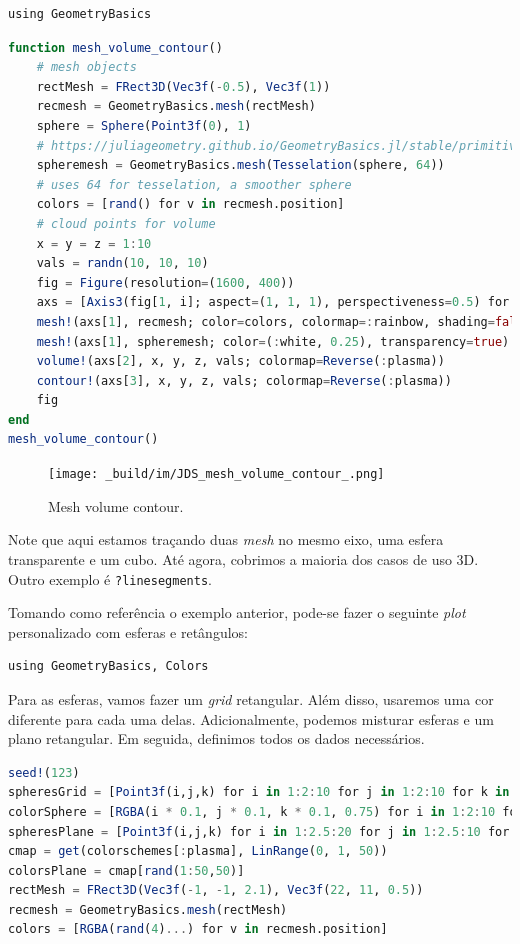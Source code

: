 \documentclass[
  notoc %
]{tufte-book}
\newcommand{\passthrough}[1]{#1}
\begin{document}
\begin{lstlisting}
using GeometryBasics
\end{lstlisting}

\begin{lstlisting}[language=Julia]
function mesh_volume_contour()
    # mesh objects
    rectMesh = FRect3D(Vec3f(-0.5), Vec3f(1))
    recmesh = GeometryBasics.mesh(rectMesh)
    sphere = Sphere(Point3f(0), 1)
    # https://juliageometry.github.io/GeometryBasics.jl/stable/primitives/
    spheremesh = GeometryBasics.mesh(Tesselation(sphere, 64))
    # uses 64 for tesselation, a smoother sphere
    colors = [rand() for v in recmesh.position]
    # cloud points for volume
    x = y = z = 1:10
    vals = randn(10, 10, 10)
    fig = Figure(resolution=(1600, 400))
    axs = [Axis3(fig[1, i]; aspect=(1, 1, 1), perspectiveness=0.5) for i = 1:3]
    mesh!(axs[1], recmesh; color=colors, colormap=:rainbow, shading=false)
    mesh!(axs[1], spheremesh; color=(:white, 0.25), transparency=true)
    volume!(axs[2], x, y, z, vals; colormap=Reverse(:plasma))
    contour!(axs[3], x, y, z, vals; colormap=Reverse(:plasma))
    fig
end
mesh_volume_contour()
\end{lstlisting}

\begin{figure}
\hypertarget{fig:mesh_volume_contour}{%
\centering
\texttt{[image: \_build/im/JDS\_mesh\_volume\_contour\_.png]}
\caption{Mesh volume contour.}\label{fig:mesh_volume_contour}
}
\end{figure}

Note que aqui estamos traçando duas \emph{mesh} no mesmo eixo, uma
esfera transparente e um cubo. Até agora, cobrimos a maioria dos casos
de uso 3D. Outro exemplo é \passthrough{\lstinline!?linesegments!}.

Tomando como referência o exemplo anterior, pode-se fazer o seguinte
\emph{plot} personalizado com esferas e retângulos:

\begin{lstlisting}
using GeometryBasics, Colors
\end{lstlisting}

Para as esferas, vamos fazer um \emph{grid} retangular. Além disso,
usaremos uma cor diferente para cada uma delas. Adicionalmente, podemos
misturar esferas e um plano retangular. Em seguida, definimos todos os
dados necessários.

\begin{lstlisting}[language=Julia]
seed!(123)
spheresGrid = [Point3f(i,j,k) for i in 1:2:10 for j in 1:2:10 for k in 1:2:10]
colorSphere = [RGBA(i * 0.1, j * 0.1, k * 0.1, 0.75) for i in 1:2:10 for j in 1:2:10 for k in 1:2:10]
spheresPlane = [Point3f(i,j,k) for i in 1:2.5:20 for j in 1:2.5:10 for k in 1:2.5:4]
cmap = get(colorschemes[:plasma], LinRange(0, 1, 50))
colorsPlane = cmap[rand(1:50,50)]
rectMesh = FRect3D(Vec3f(-1, -1, 2.1), Vec3f(22, 11, 0.5))
recmesh = GeometryBasics.mesh(rectMesh)
colors = [RGBA(rand(4)...) for v in recmesh.position]
\end{lstlisting}
\end{document}
